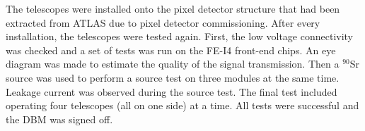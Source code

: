 The telescopes were installed onto the pixel detector structure that had been extracted from ATLAS due to pixel detector commissioning. 
After every installation, the telescopes were tested again. First, the low voltage connectivity was checked and a set of tests was run on the FE-I4 front-end chips. An eye diagram was made to estimate the quality of the signal transmission. Then a $^{90}$Sr source was used to perform a source test on three modules at the same time. Leakage current was observed during the source test. The final test included operating four telescopes (all on one side) at a time. All tests were successful and the DBM was signed off.

